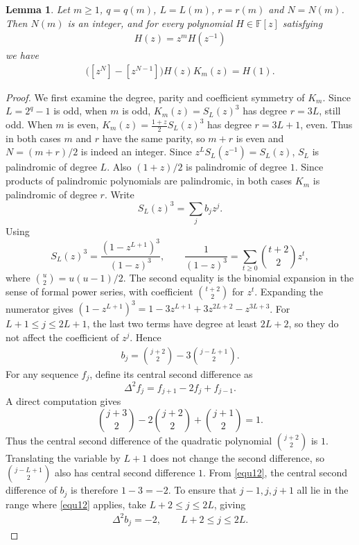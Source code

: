 \documentclass[11pt,a4paper]{article}
\newtheorem{lemma}[theorem]{Lemma}
\begin{document}
\begin{lemma}\label{lem2.8}
Let $m\geq1$, $q=q(m)$, $L=L(m)$, $r=r(m)$ and $N=N(m)$. Then $N(m)$ is an integer, and for every polynomial $H\in\mathbb{F}[z]$ satisfying
\begin{eqnarray}\label{equ10}
  H(z)=z^mH(z^{-1})
\end{eqnarray}
we have
\begin{eqnarray}\label{equ11}
  \bigl([z^N]-[z^{N-1}]\bigr)H(z)K_m(z)=H(1).
\end{eqnarray}
\end{lemma}
\begin{proof}
We first examine the degree, parity and coefficient symmetry of $K_m$. Since $L=2^q-1$ is odd, when $m$ is odd,
$K_m(z)=S_L(z)^3$ has degree $r=3L$, still odd. When $m$ is even, $K_m(z)=\frac{1+z}{2}S_L(z)^3$ has degree $r=3L+1$, even.
Thus in both cases $m$ and $r$ have the same parity, so $m+r$ is even and $N=(m+r)/2$ is indeed an integer. Since $z^LS_L(z^{-1})=S_L(z)$, $S_L$ is palindromic of degree $L$. Also $(1+z)/2$ is palindromic of degree $1$. Since products of palindromic polynomials are palindromic, in both cases $K_m$ is palindromic of degree $r$.
Write
\[
  S_L(z)^3=\sum_j b_jz^j.
\]
Using
\[
  S_L(z)^3=\frac{(1-z^{L+1})^3}{(1-z)^3},
  \qquad
  \frac1{(1-z)^3}=\sum_{t\geq0}\binom{t+2}{2}z^t,
\]
where $\binom{u}{2}=u(u-1)/2$. The second equality is the binomial expansion in the sense of formal power series, with coefficient $\binom{t+2}{2}$ for $z^t$.
Expanding the numerator gives $(1-z^{L+1})^3=1-3z^{L+1}+3z^{2L+2}-z^{3L+3}$.
For $L+1\leq j\leq2L+1$, the last two terms have degree at least $2L+2$, so they do not affect the coefficient of $z^j$. Hence
\begin{eqnarray}\label{equ12}
  b_j=\binom{j+2}{2}-3\binom{j-L+1}{2}.
\end{eqnarray}
For any sequence $f_j$, define its central second difference as
\[
  \Delta^2f_j=f_{j+1}-2f_j+f_{j-1}.
\]
A direct computation gives
\[
  \binom{j+3}{2}-2\binom{j+2}{2}+\binom{j+1}{2}=1.
\]
Thus the central second difference of the quadratic polynomial $\binom{j+2}{2}$ is $1$. Translating the variable by $L+1$ does not change the second difference, so $\binom{j-L+1}{2}$ also has central second difference $1$. From \eqref{equ12}, the central second difference of $b_j$ is therefore $1-3=-2$.
To ensure that $j-1,j,j+1$ all lie in the range where \eqref{equ12} applies, take $L+2\leq j\leq2L$, giving
\begin{eqnarray}\label{equ13}
  \Delta^2 b_j=-2,
  \qquad L+2\leq j\leq 2L.

\end{eqnarray}
\end{proof}
\end{document}
